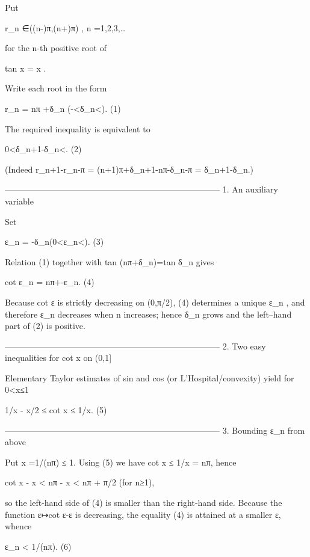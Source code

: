 Put  

r_n ∈((n-)π,(n+)π) ,                            n =1,2,3,…  

for the n-th positive root of  

tan x = x .  

Write each root in the form  

r_n = nπ +δ_n \qquad(-<δ_n<).                     (1)

The required inequality is equivalent to  

0<δ_{n+1}-δ_n<.                                        (2)

(Indeed  
r_{n+1}-r_n-π = (n+1)π+δ_{n+1}-nπ-δ_n-π = δ_{n+1}-δ_n.)

-----------------------------------------------------------------------------
1.  An auxiliary variable  

Set  

ε_n = -δ_n\qquad(0<ε_n<).                        (3)

Relation (1) together with tan (nπ+δ_n)=tan δ_n gives  

cot ε_n = nπ+-ε_n.                                        (4)

Because cot ε is strictly decreasing on (0,π/2), (4) determines a unique  
ε_n , and therefore ε_n decreases when n increases; hence δ_n grows and the
 left–hand part of (2) is positive.

-----------------------------------------------------------------------------
2.  Two easy inequalities for cot x on (0,1]

Elementary Taylor estimates of sin and cos (or L’Hospital/convexity) yield for 0<x≤1  

1/x - x/2  ≤ cot x ≤ 1/x.                                           (5)

-----------------------------------------------------------------------------
3.  Bounding ε_n from above

Put x =1/(nπ) ≤ 1.  
Using (5) we have cot x ≤ 1/x = nπ, hence

cot x - x < nπ - x < nπ + π/2                                (for n≥1),

so the left‐hand side of (4) is smaller than the right‐hand side.
Because the function ε↦cot ε-ε is decreasing, the equality (4)
is attained at a smaller ε, whence  

ε_n < 1/(nπ).                                                       (6)

